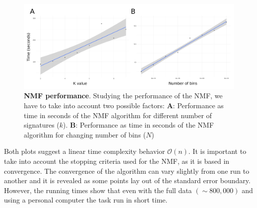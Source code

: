 \begin{figure}[h]
    \centering
    \includegraphics[width=\textwidth]{Figures/performance/performance_nmf_join.png}
    \caption[NMF performance]{\textbf{NMF performance}. Studying the performance of the NMF, we have to take into account two possible factors: \textbf{A}: Performance as time in seconds of the NMF algorithm for different number of signatures (\(k\)). \textbf{B}: Performance as time in seconds of the NMF algorithm for changing number of bins (\(N\))}
    \label{fig:NMF}
\end{figure}

\medskip

Both plots suggest a linear time complexity behavior \(\mathcal{O}(n)\). It is important to take into account the stopping criteria used for the NMF, as it is based in convergence. The convergence of the algorithm can vary slightly from one run to another and it is revealed as some points lay out of the standard error boundary. However, the running times show that even with the full data \((\sim800,000)\) and using a personal computer the task run in short time.
